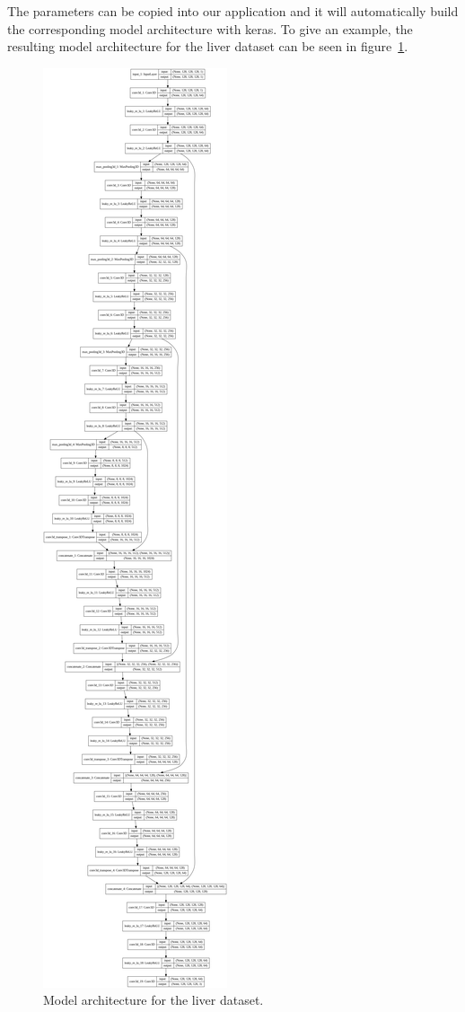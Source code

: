 \documentclass{article}
\begin{document}
			The parameters can be copied into our application and it will automatically build the corresponding model architecture with keras. To give an example, the resulting model architecture for the liver dataset can be seen in figure~\ref{fig:figure1}.

			\begin{figure}[htbp]
				\centering
				\includegraphics[height=\textheight]{model.png}
				\caption{Model architecture for the liver dataset.}
				\label{fig:figure1}
			\end{figure}
\end{document}
